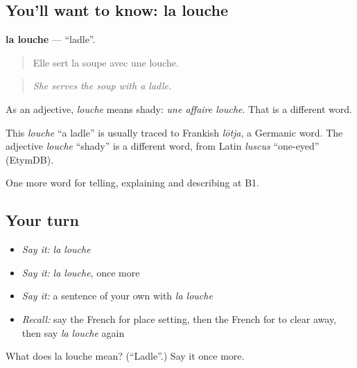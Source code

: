 \subsection*{You'll want to know: la louche}
\textbf{la louche} — \textquotedblleft{}ladle\textquotedblright{}.

\begin{quote}
Elle sert la soupe avec une louche.
\end{quote}

\begin{quote}
\emph{She serves the soup with a ladle.}
\end{quote}

As an adjective, \emph{louche} means shady: \emph{une affaire louche}. That is a different word.

\begin{cousinweb}
This \emph{louche} \textquotedblleft{}a ladle\textquotedblright{} is usually traced to Frankish \emph{lōtja}, a Germanic word. The adjective \emph{louche} \textquotedblleft{}shady\textquotedblright{} is a different word, from Latin \emph{luscus} \textquotedblleft{}one-eyed\textquotedblright{} (EtymDB).
\end{cousinweb}

\begin{grammarlens}[title={What you've built}]
One more word for telling, explaining and describing at B1.
\end{grammarlens}

\subsection*{Your turn}
\begin{itemize}
\raggedright
  \item \emph{Say it:} \emph{la louche}
  \item \emph{Say it:} \emph{la louche}, once more
  \item \emph{Say it:} a sentence of your own with \emph{la louche}
  \item \emph{Recall:} say the French for place setting, then the French for to clear away, then say \emph{la louche} again
\end{itemize}

\begin{tcolorbox}[breakable,colback=teal!4,colframe=teal!35!black,title={Before you move on}]
What does la louche mean? (\textquotedblleft{}Ladle\textquotedblright{}.) Say it once more.
\end{tcolorbox}
